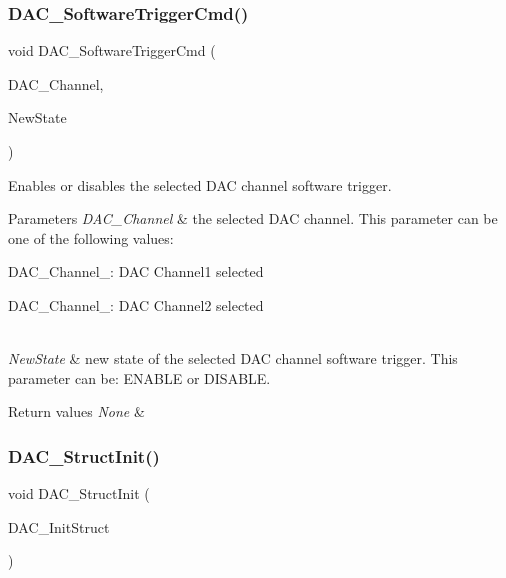 \subsubsection{\texorpdfstring{DAC\_SoftwareTriggerCmd()}{DAC\_SoftwareTriggerCmd()}}
{\footnotesize\ttfamily void D\+A\+C\+\_\+\+Software\+Trigger\+Cmd (\begin{DoxyParamCaption}\item[{uint32\+\_\+t}]{D\+A\+C\+\_\+\+Channel,  }\item[{\mbox{\hyperlink{group___exported__types_gac9a7e9a35d2513ec15c3b537aaa4fba1}{Functional\+State}}}]{New\+State }\end{DoxyParamCaption})}



Enables or disables the selected D\+AC channel software trigger. 


\begin{DoxyParams}{Parameters}
{\em D\+A\+C\+\_\+\+Channel} & the selected D\+AC channel. This parameter can be one of the following values\+: \begin{DoxyItemize}
\item D\+A\+C\+\_\+\+Channel\+\_\+: D\+AC Channel1 selected \item D\+A\+C\+\_\+\+Channel\+\_\+: D\+AC Channel2 selected \end{DoxyItemize}
\\
\hline
{\em New\+State} & new state of the selected D\+AC channel software trigger. This parameter can be\+: E\+N\+A\+B\+LE or D\+I\+S\+A\+B\+LE. \\
\hline
\end{DoxyParams}

\begin{DoxyRetVals}{Return values}
{\em None} & \\
\hline
\end{DoxyRetVals}
\mbox{\label{group___d_a_c___exported___functions_gadfc270974d54cb5fa5f92556015c4046}} 
\subsubsection{\texorpdfstring{DAC\_StructInit()}{DAC\_StructInit()}}
{\footnotesize\ttfamily void D\+A\+C\+\_\+\+Struct\+Init (\begin{DoxyParamCaption}\item[{\mbox{\hyperlink{struct_d_a_c___init_type_def}{D\+A\+C\+\_\+\+Init\+Type\+Def}} $\ast$}]{D\+A\+C\+\_\+\+Init\+Struct }\end{DoxyParamCaption})}



